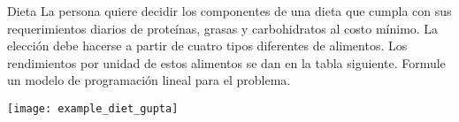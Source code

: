 \begin{frameExample}{Dieta}{}
  La persona quiere decidir los componentes de una dieta que cumpla con sus requerimientos diarios de proteínas, grasas y carbohidratos al costo mínimo. La elección debe hacerse a partir de cuatro tipos diferentes de alimentos. Los rendimientos por unidad de estos alimentos se dan en la tabla siguiente. Formule un modelo de programación lineal para el problema.
  
  {\centering
\texttt{[image: example\_diet\_gupta]}
\par}

  
\end{frameExample}



